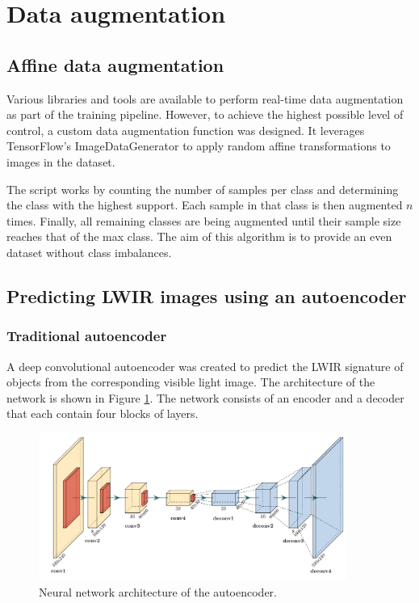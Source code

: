 \documentclass{l4proj}
\begin{document}

\section{Data augmentation}

\subsection{Affine data augmentation}

Various libraries and tools are available to perform real-time data augmentation as part of the training pipeline. However, to achieve the highest possible level of control, a custom data augmentation function was designed. It leverages TensorFlow's ImageDataGenerator to apply random affine transformations to images in the dataset.

The script works by counting the number of samples per class and determining the class with the highest support. Each sample in that class is then augmented $n$ times. Finally, all remaining classes are being augmented until their sample size reaches that of the max class. The aim of this algorithm is to provide an even dataset without class imbalances.


\subsection{Predicting LWIR images using an autoencoder}
\label{autoencoder_implementation}

\subsubsection{Traditional autoencoder}

A deep convolutional autoencoder was created to predict the LWIR signature of objects from the corresponding visible light image. The architecture of the network is shown in Figure \ref{fig:autoencoder_architecture}. The network consists of an encoder and a decoder that each contain four blocks of layers.

\begin{figure}[ht]
  \centering
  \includegraphics[width=0.9\textwidth]{images/models/autoencoder}
  \caption{Neural network architecture of the autoencoder.}
  \label{fig:autoencoder_architecture}
\end{figure}
\end{document}
